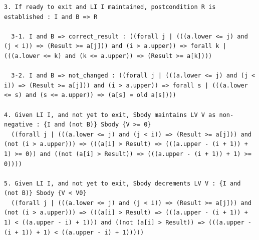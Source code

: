 \documentclass[a0,landscape]{a0poster}
\begin{document}
\begin{multicols}{4}
\begin{lstlisting}
3. If ready to exit and LI I maintained, postcondition R is established : I and B => R

  3-1. I and B => correct_result : ((forall j | (((a.lower <= j) and (j < i)) => (Result >= a[j])) and (i > a.upper)) => forall k | (((a.lower <= k) and (k <= a.upper)) => (Result >= a[k])))

  3-2. I and B => not_changed : ((forall j | (((a.lower <= j) and (j < i)) => (Result >= a[j])) and (i > a.upper)) => forall s | (((a.lower <= s) and (s <= a.upper)) => (a[s] = old a[s])))

4. Given LI I, and not yet to exit, Sbody maintains LV V as non-negative : {I and (not B)} Sbody {V >= 0}
  ((forall j | (((a.lower <= j) and (j < i)) => (Result >= a[j])) and (not (i > a.upper))) => (((a[i] > Result) => (((a.upper - (i + 1)) + 1) >= 0)) and ((not (a[i] > Result)) => (((a.upper - (i + 1)) + 1) >= 0))))

5. Given LI I, and not yet to exit, Sbody decrements LV V : {I and (not B)} Sbody {V < V0}
  ((forall j | (((a.lower <= j) and (j < i)) => (Result >= a[j])) and (not (i > a.upper))) => (((a[i] > Result) => (((a.upper - (i + 1)) + 1) < ((a.upper - i) + 1))) and ((not (a[i] > Result)) => (((a.upper - (i + 1)) + 1) < ((a.upper - i) + 1)))))


\end{lstlisting}
\end{multicols}
\end{document}
